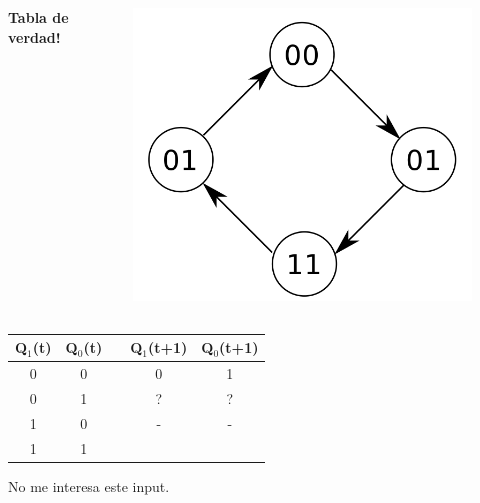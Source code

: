 \documentclass[10pt]{beamer}
\begin{document}
\begin{frame}
{\begin{columns}
            \textbf{Tabla de verdad!}
              \begin{figure}[h!]
                  \centering
                  \includegraphics[scale=0.2]{ej1.png}
              \end{figure}
      \end{columns}
        \begin{table}[h!]
      \begin{tabular}{|c|c|c|c|c|}
      \hline
      Q$_1$(t) & Q$_0$(t) &  & Q$_1$(t+1) & Q$_0$(t+1) \\ \hline
      0        & 0        &  & 0          & 1          \\ \hline
      0        & 1        &  & ?          & ?          \\ \hline
      1        & 0        &  & -          & -          \\ \hline
      1        & 1        &  &           &           \\ \hline
      \end{tabular}
      \end{table}
    No me interesa este input.}
\end{frame}
\end{document}
